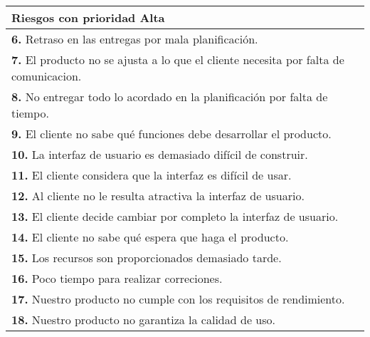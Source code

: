 \documentclass[spanish,a4paper,12pt]{report}	%
\begin{document}
			\begin{tabular}{|p{12cm}|}
				\hline
				\textbf{Riesgos con prioridad Alta}\\ \hline \hline
				\textbf{6.} Retraso en las entregas por mala planificación.\\ \hline 
				\textbf{7.} El producto no se ajusta a lo que el cliente necesita por falta de comunicacion. \\ \hline
				\textbf{8.}  No entregar todo lo acordado en la planificación por falta de tiempo.\\ \hline
				\textbf{9.} El cliente no sabe qué funciones debe desarrollar el producto. \\ \hline
				\textbf{10.} La interfaz de usuario es demasiado difícil de construir. \\ \hline
				\textbf{11.} El cliente considera que la interfaz es difícil de usar.		\\ \hline
				\textbf{12.} Al cliente no le resulta atractiva la interfaz de usuario.			\\ \hline
				\textbf{13.} El cliente decide cambiar por completo la interfaz de usuario.			\\ \hline
				\textbf{14.} El cliente no sabe qué espera que haga el producto.			\\ \hline
				\textbf{15. }Los recursos son proporcionados demasiado tarde. 				\\ \hline
				\textbf{16. }Poco tiempo para realizar correciones. \\ \hline
				\textbf{17. }Nuestro producto no cumple con los requisitos de rendimiento. \\ \hline
				\textbf{18. }Nuestro producto no garantiza la calidad de uso. \\ \hline
		
			\end{tabular}
				\ \\
				\ \\
			
\end{document}
